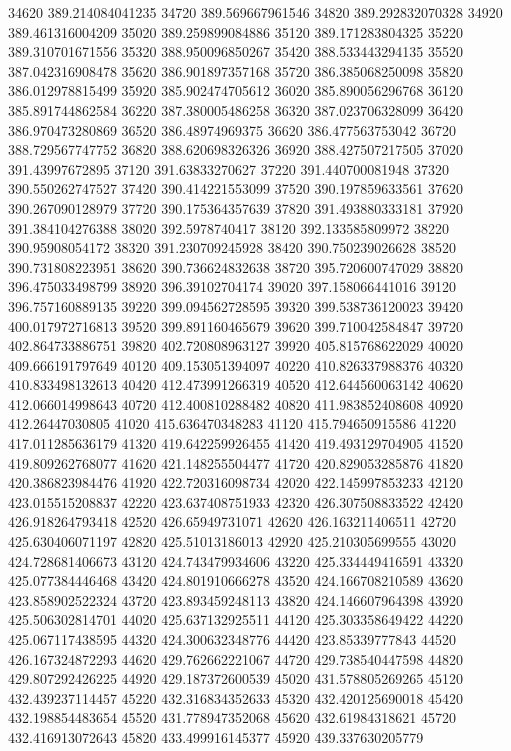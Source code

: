 {34620 389.214084041235
34720 389.569667961546
34820 389.292832070328
34920 389.461316004209
35020 389.259899084886
35120 389.171283804325
35220 389.310701671556
35320 388.950096850267
35420 388.533443294135
35520 387.042316908478
35620 386.901897357168
35720 386.385068250098
35820 386.012978815499
35920 385.902474705612
36020 385.890056296768
36120 385.891744862584
36220 387.380005486258
36320 387.023706328099
36420 386.970473280869
36520 386.48974969375
36620 386.477563753042
36720 388.729567747752
36820 388.620698326326
36920 388.427507217505
37020 391.43997672895
37120 391.63833270627
37220 391.440700081948
37320 390.550262747527
37420 390.414221553099
37520 390.197859633561
37620 390.267090128979
37720 390.175364357639
37820 391.493880333181
37920 391.384104276388
38020 392.5978740417
38120 392.133585809972
38220 390.95908054172
38320 391.230709245928
38420 390.750239026628
38520 390.731808223951
38620 390.736624832638
38720 395.720600747029
38820 396.475033498799
38920 396.39102704174
39020 397.158066441016
39120 396.757160889135
39220 399.094562728595
39320 399.538736120023
39420 400.017972716813
39520 399.891160465679
39620 399.710042584847
39720 402.864733886751
39820 402.720808963127
39920 405.815768622029
40020 409.666191797649
40120 409.153051394097
40220 410.826337988376
40320 410.833498132613
40420 412.473991266319
40520 412.644560063142
40620 412.066014998643
40720 412.400810288482
40820 411.983852408608
40920 412.26447030805
41020 415.636470348283
41120 415.794650915586
41220 417.011285636179
41320 419.642259926455
41420 419.493129704905
41520 419.809262768077
41620 421.148255504477
41720 420.829053285876
41820 420.386823984476
41920 422.720316098734
42020 422.145997853233
42120 423.015515208837
42220 423.637408751933
42320 426.307508833522
42420 426.918264793418
42520 426.65949731071
42620 426.163211406511
42720 425.630406071197
42820 425.51013186013
42920 425.210305699555
43020 424.728681406673
43120 424.743479934606
43220 425.334449416591
43320 425.077384446468
43420 424.801910666278
43520 424.166708210589
43620 423.858902522324
43720 423.893459248113
43820 424.146607964398
43920 425.506302814701
44020 425.637132925511
44120 425.303358649422
44220 425.067117438595
44320 424.300632348776
44420 423.85339777843
44520 426.167324872293
44620 429.762662221067
44720 429.738540447598
44820 429.807292426225
44920 429.187372600539
45020 431.578805269265
45120 432.439237114457
45220 432.316834352633
45320 432.420125690018
45420 432.198854483654
45520 431.778947352068
45620 432.61984318621
45720 432.416913072643
45820 433.499916145377
45920 439.337630205779
}

